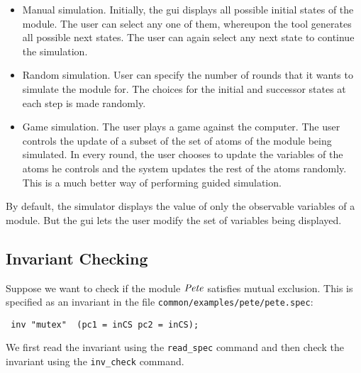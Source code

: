 \begin{itemize}
\item Manual simulation. Initially, the gui displays all possible
initial states of the module. The user can select any one of them,
whereupon the tool generates all possible next states. The user can
again select any next state to continue the simulation.
\item Random simulation. User can specify the number of rounds that it
wants to simulate the module for. The choices for the initial and
successor states at each step is made randomly.
\item Game simulation. The user plays a game against the computer. The
user controls the update of a subset of the set of atoms of the module
being simulated. In every round, the user chooses to update the
variables of the atoms he controls and the system updates the rest of
the atoms randomly. This is a much better way of performing guided
simulation. 
\end{itemize}

By default, the simulator displays the value of only the observable
variables of a module. But the gui lets the user modify the set of
variables being displayed. 


\subsection{Invariant Checking}
Suppose we want to check if the module ${\it Pete\/}$ satisfies mutual exclusion.
This is specified as an invariant in the file 
{\tt common/examples/pete/pete.spec}:

{\tt
inv "mutex" ~(pc1 = inCS \AND pc2 = inCS); \\
}

\mypar
We first read the invariant using the 
{\tt read\_spec} command and then check the invariant using the
{\tt inv\_check} command.

